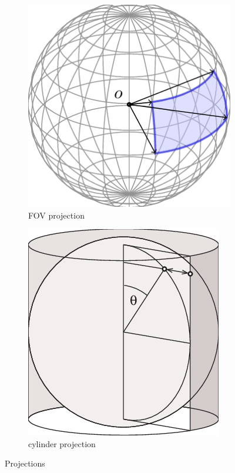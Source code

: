 \documentclass[conference]{IEEEtran}
\begin{document}
\begin{figure}[h]
    \centering
    \begin{subfigure}{0.2\textwidth}
        \includegraphics[width=\linewidth]{fov.png}
        \caption{FOV projection}
        \label{fig:FOV}
    \end{subfigure}
    \hfil
    \begin{subfigure}{0.2\textwidth}
        \includegraphics[width=\linewidth]{area-preserving-mapping-of-a-sphere-onto-a-cylinder.png}
        \caption{cylinder projection}
        \label{fig:cylinder}
    \end{subfigure}
    \caption{Projections}
\end{figure}
\end{document}
